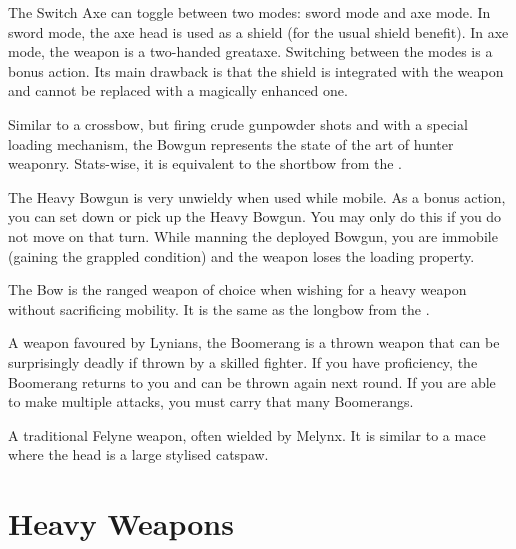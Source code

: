 The Switch Axe can toggle between two modes: sword mode and axe mode. In sword mode, the axe head is used as a shield (for the usual shield benefit). In axe mode, the weapon is a two-handed greataxe. Switching between the modes is a bonus action. Its main drawback is that the shield is integrated with the weapon and cannot be replaced with a magically enhanced one.

Similar to a crossbow, but firing crude gunpowder shots and with a special loading mechanism, the Bowgun represents the state of the art of hunter weaponry. Stats-wise, it is equivalent to the shortbow from the \PHB.

The Heavy Bowgun is very unwieldy when used while mobile. As a bonus action, you can set down or pick up the Heavy Bowgun. You may only do this if you do not move on that turn. While manning the deployed Bowgun, you are immobile (gaining the grappled condition) and the weapon loses the loading property.

The Bow is the ranged weapon of choice when wishing for a heavy weapon without sacrificing mobility. It is the same as the longbow from the \PHB.

A weapon favoured by Lynians, the Boomerang is a thrown weapon that can be surprisingly deadly if thrown by a skilled fighter. If you have proficiency, the Boomerang returns to you and can be thrown again next round. If you are able to make multiple attacks, you must carry that many Boomerangs.

A traditional Felyne weapon, often wielded by Melynx. It is similar to a mace where the head is a large stylised catspaw.

\section{Heavy Weapons}


